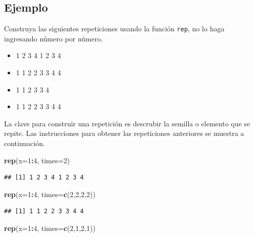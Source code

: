 \documentclass[10pt,]{krantz}
\makeatletter
\newenvironment{Shaded}{\begin{snugshade}}{\end{snugshade}}
\newcommand{\KeywordTok}[1]{\textcolor[rgb]{0.13,0.29,0.53}{\textbf{#1}}}
\newcommand{\DataTypeTok}[1]{\textcolor[rgb]{0.13,0.29,0.53}{#1}}
\newcommand{\DecValTok}[1]{\textcolor[rgb]{0.00,0.00,0.81}{#1}}
\newcommand{\OperatorTok}[1]{\textcolor[rgb]{0.81,0.36,0.00}{\textbf{#1}}}
\newcommand{\NormalTok}[1]{#1}
\providecommand{\tightlist}{%
  \setlength{\itemsep}{0pt}\setlength{\parskip}{0pt}}
\newenvironment{kframe}{%
\medskip{}
\setlength{\fboxsep}{.8em}
 \def\at@end@of@kframe{}%
 \ifinner\ifhmode%
  \def\at@end@of@kframe{\end{minipage}}%
  \begin{minipage}{\columnwidth}%
 \fi\fi%
 \def\FrameCommand##1{\hskip\@totalleftmargin \hskip-\fboxsep
 \colorbox{shadecolor}{##1}\hskip-\fboxsep
     \hskip-\linewidth \hskip-\@totalleftmargin \hskip\columnwidth}%
 \MakeFramed {\advance\hsize-\width
   \@totalleftmargin\z@ \linewidth\hsize
   \@setminipage}}%
 {\par\unskip\endMakeFramed%
 \at@end@of@kframe}
\renewenvironment{Shaded}{\begin{kframe}}{\end{kframe}}
\makeatother
\begin{document}
\subsection*{Ejemplo}\label{ejemplo-11}


Construya las siguientes repeticiones usando la función \texttt{rep}, no
lo haga ingresando número por número.

\begin{itemize}
\tightlist
\item
  1 2 3 4 1 2 3 4
\item
  1 1 2 2 3 3 4 4
\item
  1 1 2 3 3 4
\item
  1 1 2 2 3 3 4 4
\end{itemize}

La clave para construir una repetición es descrubir la semilla o
elemento que se repite. Las instrucciones para obtener las repeticiones
anteriores se muestra a continuación.

\begin{Shaded}
\begin{Highlighting}[]
\KeywordTok{rep}\NormalTok{(}\DataTypeTok{x=}\DecValTok{1}\OperatorTok{:}\DecValTok{4}\NormalTok{, }\DataTypeTok{times=}\DecValTok{2}\NormalTok{)}
\end{Highlighting}
\end{Shaded}

\begin{verbatim}
## [1] 1 2 3 4 1 2 3 4
\end{verbatim}

\begin{Shaded}
\begin{Highlighting}[]
\KeywordTok{rep}\NormalTok{(}\DataTypeTok{x=}\DecValTok{1}\OperatorTok{:}\DecValTok{4}\NormalTok{, }\DataTypeTok{times=}\KeywordTok{c}\NormalTok{(}\DecValTok{2}\NormalTok{,}\DecValTok{2}\NormalTok{,}\DecValTok{2}\NormalTok{,}\DecValTok{2}\NormalTok{))}
\end{Highlighting}
\end{Shaded}

\begin{verbatim}
## [1] 1 1 2 2 3 3 4 4
\end{verbatim}

\begin{Shaded}
\begin{Highlighting}[]
\KeywordTok{rep}\NormalTok{(}\DataTypeTok{x=}\DecValTok{1}\OperatorTok{:}\DecValTok{4}\NormalTok{, }\DataTypeTok{times=}\KeywordTok{c}\NormalTok{(}\DecValTok{2}\NormalTok{,}\DecValTok{1}\NormalTok{,}\DecValTok{2}\NormalTok{,}\DecValTok{1}\NormalTok{))}
\end{Highlighting}
\end{Shaded}
\end{document}
